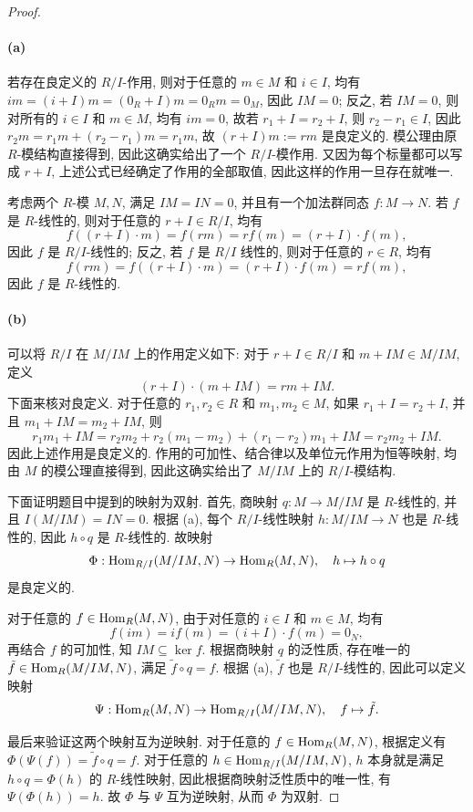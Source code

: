 \documentclass{article}
\begin{document}
\begin{proof}
	\paragraph{(a)} 若存在良定义的 $R/I$-作用, 则对于任意的 $m \in M$ 和 $i \in I$, 均有 $im = (i + I)m = (0_R + I)m = 0_Rm = 0_M$, 因此 $IM = 0$; 反之, 若 $IM = 0$, 则对所有的 $i \in I$ 和 $m \in M$, 均有 $im = 0$, 故若 $r_1 + I = r_2 + I$, 则 $r_2 - r_1 \in I$, 因此 $r_2 m = r_1 m + (r_2 - r_1) m = r_1 m$, 故 $(r + I) m := rm$ 是良定义的. 模公理由原 $R$-模结构直接得到, 因此这确实给出了一个 $R/I$-模作用. 又因为每个标量都可以写成 $r+I$, 上述公式已经确定了作用的全部取值, 因此这样的作用一旦存在就唯一.

	考虑两个 $R$-模 $M, N$, 满足 $IM = IN = 0$, 并且有一个加法群同态 $f: M \to N$. 若 $f$ 是 $R$-线性的, 则对于任意的 $r + I \in R/I$, 均有
	\[ f((r + I)\cdot m) = f(rm) = r f(m) = (r + I) \cdot f(m), \]
	因此 $f$ 是 $R/I$-线性的; 反之, 若 $f$ 是 $R/I$ 线性的, 则对于任意的 $r \in R$, 均有
	\[ f(rm) = f((r+I) \cdot m) = (r+I) \cdot f(m) = r f(m), \]
	因此 $f$ 是 $R$-线性的.

	\paragraph{(b)} 可以将 $R/I$ 在 $M/IM$ 上的作用定义如下: 对于 $r+I \in R/I$ 和 $m + IM \in M/IM$, 定义
	\[ (r+I) \cdot (m + IM) = rm + IM. \]
	下面来核对良定义. 对于任意的 $r_1, r_2 \in R$ 和 $m_1, m_2 \in M$, 如果 $r_1 + I = r_2 + I$, 并且 $m_1 + IM = m_2 + IM$, 则
	\[ r_1m_1 + IM = r_2m_2 + r_2(m_1 - m_2) + (r_1 - r_2)m_1 + IM = r_2m_2 + IM. \]
	因此上述作用是良定义的. 作用的可加性、结合律以及单位元作用为恒等映射, 均由 $M$ 的模公理直接得到, 因此这确实给出了 $M/IM$ 上的 $R/I$-模结构.

	下面证明题目中提到的映射为双射. 首先, 商映射 $q: M \to M/IM$ 是 $R$-线性的, 并且 $I(M/IM) = IN = 0$. 根据 (a), 每个 $R/I$-线性映射 $h: M/IM \to N$ 也是 $R$-线性的, 因此 $h \circ q$ 是 $R$-线性的. 故映射
	\[ \Phi: \operatorname{Hom}_{R/I}(M/IM, N) \to \operatorname{Hom}_R(M, N), \quad h \mapsto h \circ q \]
	是良定义的.

	对于任意的 $f \in \operatorname{Hom}_R(M, N)$, 由于对任意的 $i \in I$ 和 $m \in M$, 均有
	\[ f(im) = i f(m) = (i+I) \cdot f(m) = 0_N, \]
	再结合 $f$ 的可加性, 知 $IM \subseteq \ker f$. 根据商映射 $q$ 的泛性质, 存在唯一的 $\tilde{f} \in \operatorname{Hom}_R(M/IM, N)$, 满足 $\tilde{f} \circ q = f$. 根据 (a), $\tilde{f}$ 也是 $R/I$-线性的, 因此可以定义映射
	\[ \Psi: \operatorname{Hom}_R(M, N) \to \operatorname{Hom}_{R/I}(M/IM, N), \quad f \mapsto \tilde{f}. \]

	最后来验证这两个映射互为逆映射. 对于任意的 $f \in \operatorname{Hom}_R(M, N)$, 根据定义有 $\Phi(\Psi(f)) = \tilde{f} \circ q = f$. 对于任意的 $h \in \operatorname{Hom}_{R/I}(M/IM, N)$, $h$ 本身就是满足 $h \circ q = \Phi(h)$ 的 $R$-线性映射, 因此根据商映射泛性质中的唯一性, 有 $\Psi(\Phi(h)) = h$. 故 $\Phi$ 与 $\Psi$ 互为逆映射, 从而 $\Phi$ 为双射.
\end{proof}
\end{document}
